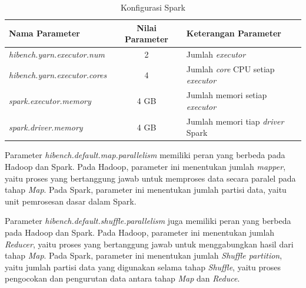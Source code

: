 \begin{table}[h]
\caption{Konfigurasi Spark}
\label{table:conf-spark}
\centering
\begin{tabular}{l c p{5cm}} 
\hline
\textbf{Nama Parameter} & \textbf{Nilai Parameter} & \textbf{Keterangan Parameter} \\ \hline
\textit{hibench.yarn.executor.num} & 2 & Jumlah \textit{executor} \\
\textit{hibench.yarn.executor.cores} & 4 & Jumlah \textit{core} CPU setiap \textit{executor}\\ 
\textit{spark.executor.memory} & 4 GB & Jumlah memori setiap \textit{executor} \\
\textit{spark.driver.memory} & 4 GB & Jumlah memori tiap \textit{driver} Spark\\ \hline                        
\end{tabular}
\end{table}

Parameter \textit{hibench.default.map.parallelism} memiliki peran yang berbeda pada Hadoop dan Spark. Pada Hadoop, parameter ini menentukan jumlah \textit{mapper}, yaitu proses yang bertanggung jawab untuk memproses data secara paralel pada tahap \textit{Map}. Pada Spark, parameter ini menentukan jumlah partisi data, yaitu unit pemrosesan dasar dalam Spark.

Parameter \textit{hibench.default.shuffle.parallelism} juga memiliki peran yang berbeda pada Hadoop dan Spark. Pada Hadoop, parameter ini menentukan jumlah \textit{Reducer}, yaitu proses yang bertanggung jawab untuk menggabungkan hasil dari tahap \textit{Map}. Pada Spark, parameter ini menentukan jumlah \textit{Shuffle partition}, yaitu jumlah partisi data yang digunakan selama tahap \textit{Shuffle}, yaitu proses pengocokan dan pengurutan data antara tahap \textit{Map} dan \textit{Reduce}.


